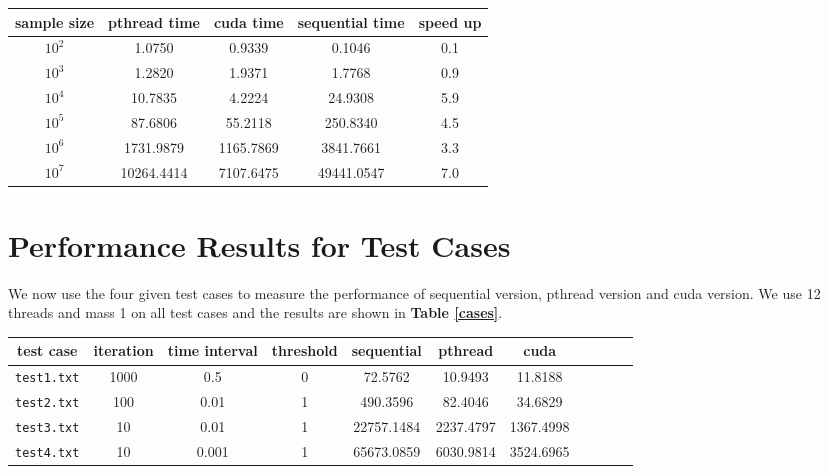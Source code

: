 \documentclass[11pt, a4paper]{article}
\makeatletter
\newcommand\tcaption{\def\@captype{table}\caption}
\newcommand{\tref}[1]{\textbf{Table \ref{#1}}}
\makeatother
\begin{document}
\begin{center}
    \tcaption{Performance on different sample size}\label{p:sample}
    \begin{tabular}{ccccc}
        \toprule
        sample size & pthread time & cuda time & sequential time & speed up \\
        \midrule
        $10^2$ & 1.0750 & 0.9339 & 0.1046 & 0.1 \\ 
        $10^3$ & 1.2820 & 1.9371 & 1.7768 & 0.9 \\ 
        $10^4$ & 10.7835 & 4.2224 & 24.9308 & 5.9 \\ 
        $10^5$ & 87.6806 & 55.2118 & 250.8340 & 4.5 \\
        $10^6$ & 1731.9879 & 1165.7869 & 3841.7661 & 3.3 \\
        $10^7$ & 10264.4414 & 7107.6475 & 49441.0547 & 7.0 \\
        \bottomrule
    \end{tabular}
\end{center}

\section{Performance Results for Test Cases}

We now use the four given test cases to measure the performance of sequential version, pthread version and cuda version. We use 12 threads and mass 1 on all test cases and the results are shown in \tref{cases}.

\begin{center}
    \tcaption{Performance results for the given test cases}\label{cases}
    \begin{tabular}{ccccccccccc}
        \toprule
        test case & iteration & time interval & threshold & sequential & pthread & cuda \\
        \midrule
        \texttt{test1.txt} & 1000 & 0.5 & 0 & 72.5762 & 10.9493 & 11.8188 \\
        \texttt{test2.txt} & 100 & 0.01 & 1 & 490.3596 & 82.4046 & 34.6829 \\
        \texttt{test3.txt} & 10 & 0.01 & 1 & 22757.1484 & 2237.4797 & 1367.4998 \\
        \texttt{test4.txt} & 10 & 0.001 & 1 & 65673.0859 & 6030.9814 & 3524.6965 \\
        \bottomrule
    \end{tabular}
\end{center}
\end{document}
